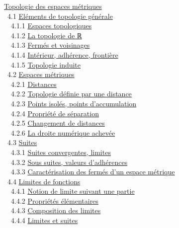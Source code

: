 \documentclass[]{article}
\begin{document}
\href{coursch5.html\#x24-1240004}{Topologie des espaces métriques} \\
~4.1 \href{coursse18.html\#x25-1250004.1}{Eléments de topologie
générale} \\ ~~4.1.1 \href{coursse18.html\#x25-1260004.1.1}{Espaces
topologiques} \\ ~~4.1.2 \href{coursse18.html\#x25-1270004.1.2}{La
topologie de ℝ} \\ ~~4.1.3 \href{coursse18.html\#x25-1280004.1.3}{Fermés
et voisinages} \\ ~~4.1.4
\href{coursse18.html\#x25-1290004.1.4}{Intérieur, adhérence, frontière}
\\ ~~4.1.5 \href{coursse18.html\#x25-1300004.1.5}{Topologie induite} \\
~4.2 \href{coursse19.html\#x26-1310004.2}{Espaces métriques} \\ ~~4.2.1
\href{coursse19.html\#x26-1320004.2.1}{Distances} \\ ~~4.2.2
\href{coursse19.html\#x26-1330004.2.2}{Topologie définie par une
distance} \\ ~~4.2.3 \href{coursse19.html\#x26-1340004.2.3}{Points
isolés, points d'accumulation} \\ ~~4.2.4
\href{coursse19.html\#x26-1350004.2.4}{Propriété de séparation} \\
~~4.2.5 \href{coursse19.html\#x26-1360004.2.5}{Changement de distances}
\\ ~~4.2.6 \href{coursse19.html\#x26-1370004.2.6}{La droite numérique
achevée} \\ ~4.3 \href{coursse20.html\#x27-1380004.3}{Suites} \\ ~~4.3.1
\href{coursse20.html\#x27-1390004.3.1}{Suites convergentes, limites} \\
~~4.3.2 \href{coursse20.html\#x27-1400004.3.2}{Sous suites, valeurs
d'adhérences} \\ ~~4.3.3
\href{coursse20.html\#x27-1410004.3.3}{Caractérisation des fermés d'un
espace métrique} \\ ~4.4 \href{coursse21.html\#x28-1420004.4}{Limites de
fonctions} \\ ~~4.4.1 \href{coursse21.html\#x28-1430004.4.1}{Notion de
limite suivant une partie} \\ ~~4.4.2
\href{coursse21.html\#x28-1440004.4.2}{Propriétés élémentaires} \\
~~4.4.3 \href{coursse21.html\#x28-1450004.4.3}{Composition des limites}
\\ ~~4.4.4 \href{coursse21.html\#x28-1460004.4.4}{Limites et suites} \\
\end{document}
